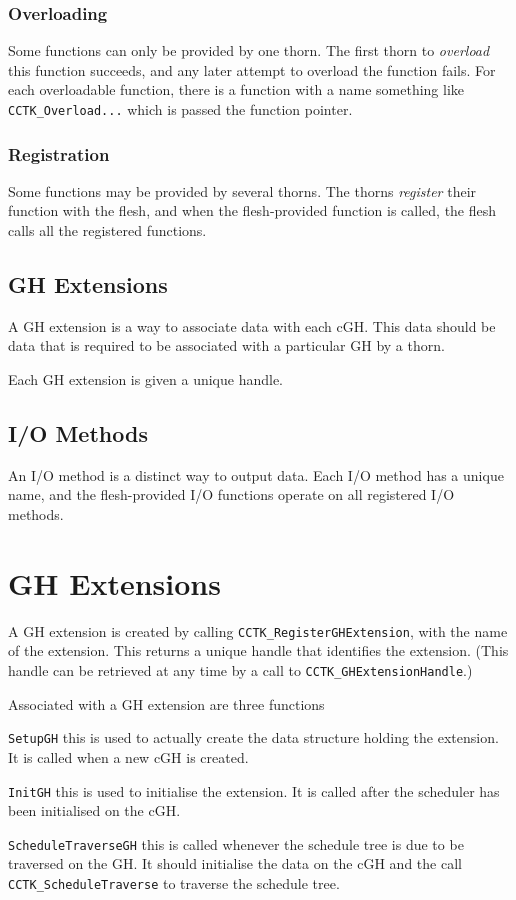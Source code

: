 \subsubsection{Overloading}

Some functions can only be provided by one thorn.  The first thorn to
\textit{overload} this function succeeds, and any later attempt to overload
the function fails.  For each overloadable function, there is a function
with a name something like {\tt CCTK\_Overload...} which is passed the
function pointer.

\subsubsection{Registration}

Some functions may be provided by several thorns.  The thorns \textit{register}
their function with the flesh, and when the flesh-provided function is called,
the flesh calls all the registered functions.

\subsection{GH Extensions}

A GH extension is a way to associate data with each cGH.  This data should be data
that is required to be associated with a particular GH by a thorn.

Each GH extension is given a unique handle.

\subsection{I/O Methods}

An I/O method is a distinct way to output data.  Each I/O method has a unique name,
and the flesh-provided I/O functions operate on all registered I/O methods.

\section{GH Extensions}

A GH extension is created by calling {\tt CCTK\_RegisterGHExtension}, with the
name of the extension.  This returns a unique handle that identifies the extension.
(This handle can be retrieved at any time by a call to {\tt CCTK\_GHExtensionHandle}.)

Associated with a GH extension are three functions

\begin{Lentry}
\item[{\tt SetupGH}]
this is used to actually create the data structure holding the extension.  It
is called when a new cGH is created.
\item[{\tt InitGH}]
this is used to initialise the extension.  It is called after the scheduler has
been initialised on the cGH.
\item[{\tt ScheduleTraverseGH}]
this is called whenever the schedule tree is due to be traversed on the GH.  It
should initialise the data on the cGH and the call {\tt CCTK\_ScheduleTraverse} to traverse
the schedule tree.
\end{Lentry}

